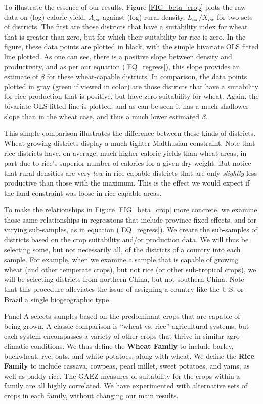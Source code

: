 To illustrate the essence of our results, Figure \ref{FIG_beta_crop} plots the raw data on (log) caloric yield, $A_{isc}$ against (log) rural density, $L_{isc}/X_{isc}$ for two sets of districts. The first are those districts that have a suitability index for wheat that is greater than zero, but for which their suitability for rice is zero. In the figure, these data points are plotted in black, with the simple bivariate OLS fitted line plotted. As one can see, there is a positive slope between density and productivity, and as per our equation (\ref{EQ_regress}), this slope provides an estimate of $\beta$ for these wheat-capable districts. In comparison, the data points plotted in gray (green if viewed in color) are those districts that have a suitability for rice production that is positive, but have zero suitability for wheat. Again, the bivariate OLS fitted line is plotted, and as can be seen it has a much shallower slope than in the wheat case, and thus a much lower estimated $\beta$.

This simple comparison illustrates the difference between these kinds of districts. Wheat-growing districts display a much tighter Malthusian constraint. Note that rice districts have, on average, much higher caloric yields than wheat areas, in part due to rice's superior number of calories for a given dry weight. But notice that rural densities are very \textit{low} in rice-capable districts that are only \textit{slightly} less productive than those with the maximum. This is the effect we would expect if the land constraint was loose in rice-capable areas.

To make the relationships in Figure \ref{FIG_beta_crop} more concrete, we examine those same relationships in regressions that include province fixed effects, and for varying sub-samples, as in equation (\ref{EQ_regress}). We create the sub-samples of districts based on the crop suitability and/or production data. We will thus be selecting some, but not necessarily all, of the districts of a country into each sample. For example, when we examine a sample that is capable of growing wheat (and other temperate crops), but not rice (or other sub-tropical crops), we will be selecting districts from northern China, but not southern China. Note that this procedure alleviates the issue of assigning a country like the U.S. or Brazil a single biogeographic type.

Panel A selects samples based on the predominant crops that are capable of being grown. A classic comparison is ``wheat vs. rice'' agricultural systems, but each system encompasses a variety of other crops that thrive in similar agro-climatic conditions. We thus define the \textbf{Wheat Family} to include barley, buckwheat, rye, oats, and white potatoes, along with wheat. We define the \textbf{Rice Family} to include cassava, cowpeas, pearl millet, sweet potatoes, and yams, as well as paddy rice. The GAEZ measures of suitability for the crops within a family are all highly correlated. We have experimented with alternative sets of crops in each family, without changing our main results. 

